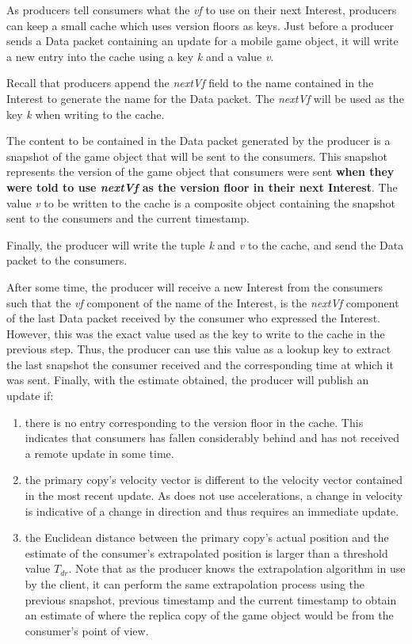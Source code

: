 As producers tell consumers what the \textit{vf} to use on their next Interest, producers can keep a small cache which uses version floors as keys. Just before a producer sends a Data packet containing an update for a mobile game object, it will write a new entry into the cache using a key \textit{k} and a value \textit{v}. 

Recall that producers append the \textit{nextVf} field to the name contained in the Interest to generate the name for the Data packet. The \textit{nextVf} will be used as the key \textit{k} when writing to the cache.

The content to be contained in the Data packet generated by the producer is a snapshot of the game object that will be sent to the consumers. This snapshot represents the version of the game object that consumers were sent \textbf{when they were told to use \textit{nextVf} as the version floor in their next Interest}. The value \textit{v} to be written to the cache is a composite object containing the snapshot sent to the consumers and the current timestamp. 

Finally, the producer will write the tuple \textit{k} and \textit{v} to the cache, and send the Data packet to the consumers. 

After some time, the producer will receive a new Interest from the consumers such that the \textit{vf} component of the name of the Interest, is the \textit{nextVf} component of the last Data packet received by the consumer who expressed the Interest. However, this was the exact value used as the key to write to the cache in the previous step. Thus, the producer can use this value as a lookup key to extract the last snapshot the consumer received and the corresponding time at which it was sent. Finally, with the estimate obtained, the producer will publish an update if:


\begin{enumerate}
    \item there is no entry corresponding to the version floor in the cache. This indicates that consumers has fallen considerably behind and has not received a remote update in some time. 
    \item the primary copy's velocity vector is different to the velocity vector contained in the most recent update. As \game{} does not use accelerations, a change in velocity is indicative of a change in direction and thus requires an immediate update.
    \item the Euclidean distance between the primary copy's actual position and the estimate of the consumer's extrapolated position is larger than a threshold value $T_{dr}$. Note that as the producer knows the extrapolation algorithm in use by the client, it can perform the same extrapolation process using the previous snapshot, previous timestamp and the current timestamp to obtain an estimate of where the replica copy of the game object would be from the consumer's point of view. 
\end{enumerate}

